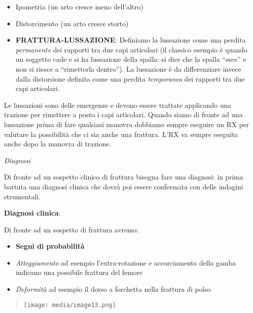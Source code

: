 \documentclass[]{article}
\begin{document}
\begin{itemize}
\item
  Ipometria (un arto cresce meno dell'altro)
\item
  Distorcimento (un arto cresce storto)
\end{itemize}

\begin{itemize}
\item
  \textbf{FRATTURA-LUSSAZIONE}: Definiamo la lussazione come una perdita
  \emph{permanente} dei rapporti tra due capi articolari (il classico
  esempio è quando un soggetto cade e si ha lussazione della spalla: si
  dice che la spalla ``esce'' e non si riesce a ``rimetterla dentro'').
  La lussazione è da differenziare invece dalla distorsione definita
  come una perdita \emph{temporanea} dei rapporti tra due capi
  articolari.
\end{itemize}

Le lussazioni sono delle emergenze e devono essere trattate applicando
una trazione per rimettere a posto i capi articolari. Quando siamo di
fronte ad una lussazione prima di fare qualsiasi manovra dobbiamo sempre
eseguire un RX per valutare la possibilità che ci sia anche una
frattura. L'RX va sempre eseguita anche dopo la manovra di trazione.

\emph{Diagnosi}

Di fronte ad un sospetto clinico di frattura bisogna fare una diagnosi:
in prima battuta una diagnosi clinica che dovrà poi essere confermata
con delle indagini strumentali.

\textbf{Diagnosi clinica}:

Di fronte ad un sospetto di frattura avremo:

\begin{itemize}
\item
  \textbf{Segni di probabilità}
\end{itemize}

\begin{itemize}
\item
  \emph{Atteggiamento} ad esempio l'extra-rotazione e accorciamento
  della gamba indicano una possibile frattura del femore
\item
  \emph{Deformità} ad esempio il dorso a forchetta nella frattura di
  polso
\end{itemize}

\begin{quote}
\texttt{[image: media/image13.png]}
\end{quote}
\end{document}
